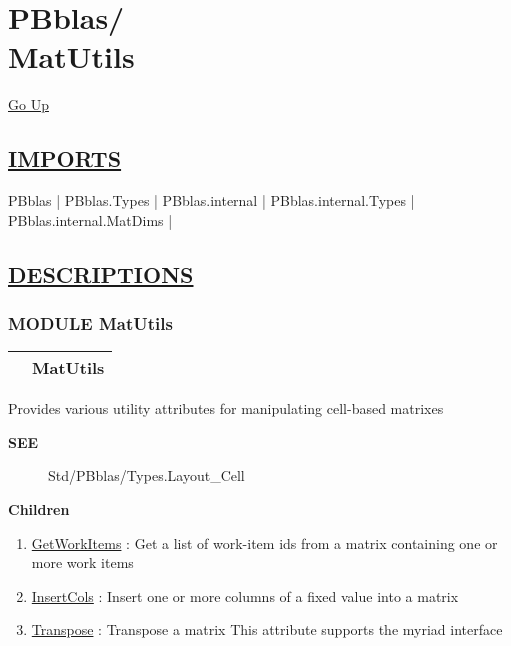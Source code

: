 \chapter*{\color{headfile}
{\large PBblas\slash\hspace{0pt}}
 \\
MatUtils
}
\hypertarget{ecldoc:toc:PBblas.MatUtils}{}
\hyperlink{ecldoc:toc:root/PBblas}{Go Up}

\section*{\underline{\textsf{IMPORTS}}}
\begin{doublespace}
{\large
PBblas |
PBblas.Types |
PBblas.internal |
PBblas.internal.Types |
PBblas.internal.MatDims |
}
\end{doublespace}

\section*{\underline{\textsf{DESCRIPTIONS}}}
\subsection*{\textsf{\colorbox{headtoc}{\color{white} MODULE}
MatUtils}}

\hypertarget{ecldoc:PBblas.MatUtils}{}

{\renewcommand{\arraystretch}{1.5}
\begin{tabularx}{\textwidth}{|>{\raggedright\arraybackslash}l|X|}
\hline
\hspace{0pt}\mytexttt{\color{red} } & \textbf{MatUtils} \\
\hline
\end{tabularx}
}

\par
Provides various utility attributes for manipulating cell-based matrixes

\par
\begin{description}
\item [\colorbox{tagtype}{\color{white} \textbf{\textsf{SEE}}}] \textbf{\underline{}} Std/PBblas/Types.Layout\_Cell
\end{description}

\textbf{Children}
\begin{enumerate}
\item \hyperlink{ecldoc:pbblas.matutils.getworkitems}{GetWorkItems}
: Get a list of work-item ids from a matrix containing one or more work items
\item \hyperlink{ecldoc:pbblas.matutils.insertcols}{InsertCols}
: Insert one or more columns of a fixed value into a matrix
\item \hyperlink{ecldoc:pbblas.matutils.transpose}{Transpose}
: Transpose a matrix This attribute supports the myriad interface
\end{enumerate}

